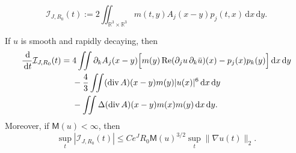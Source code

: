\documentclass[10pt,a4paper]{amsart}
\newcommand{\M}{\mathsf M}
\newcommand{\Rea}{\operatorname{Re}}
\newcommand{\R}{\mathbb R}
\newcommand{\dd}{\,\mathrm d}
\begin{document}
\begin{equation}\label{eq:Morawetz-functional}
 \mathcal I_{J,R_0}(t)
 :=2\iint_{\R^3\times\R^3}
 m(t,y)A_j(x-y)p_j(t,x)\dd x\dd y.
\end{equation}

\begin{proposition}\label{prop:exact-Morawetz}
If $u$ is smooth and rapidly decaying, then
\begin{align}
 \frac{\dd}{\dd t}\mathcal I_{J,R_0}(t)
 ={}&4\iint \partial_kA_j(x-y)
 \Bigl[
 m(y)\Rea(\partial_ju\,\partial_k\bar u)(x)
 -p_j(x)p_k(y)
 \Bigr]\dd x\dd y
 \notag\\
 &-\frac43\iint
 (\operatorname{div}A)(x-y)m(y)|u(x)|^6\dd x\dd y
 \notag\\
 &-\iint
 \Delta(\operatorname{div}A)(x-y)m(x)m(y)\dd x\dd y.
 \label{eq:exact-Morawetz-identity}
\end{align}
Moreover, if $\M(u)<\infty$, then
\begin{equation}\label{eq:Morawetz-endpoint}
 \sup_t|\mathcal I_{J,R_0}(t)|
 \le Ce^JR_0\M(u)^{3/2}
 \sup_t\|\nabla u(t)\|_2.
\end{equation}
\end{proposition}
\end{document}
